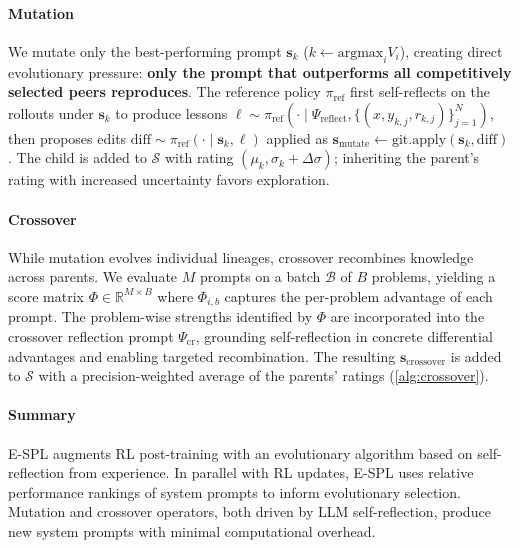 \documentclass{article}
\theoremstyle{plain}
\theoremstyle{definition}
\theoremstyle{remark}
\begin{document}
\vspace{-5pt}
\paragraph{Mutation} We mutate only the best-performing prompt $\mathbf{s}_k$ ($k \leftarrow \mathrm{argmax}_{i} V_{i}$), creating direct evolutionary pressure: \textbf{only the prompt that outperforms all competitively selected peers reproduces}. The reference policy $\pi_{\text{ref}}$ first self-reflects on the rollouts under $\mathbf{s}_k$ to produce lessons $\ell \sim \pi_{\text{ref}}(\cdot \mid \Psi_{\text{reflect}}, \{(x, y_{k,j}, r_{k,j})\}_{j=1}^{N})$, then proposes edits $\mathrm{diff} \sim \pi_{\text{ref}}(\cdot \mid \mathbf{s}_{k}, \ell)$ applied as $\mathbf{s}_{\text{mutate}} \leftarrow \mathrm{git}.\mathrm{apply}(\mathbf{s}_{k}, \mathrm{diff})$. The child is added to $\mathcal{S}$ with rating $(\mu_{k}, \sigma_{k}+\Delta \sigma)$; inheriting the parent's rating with increased uncertainty favors exploration.


\vspace{-5pt}
\paragraph{Crossover} While mutation evolves individual lineages, crossover recombines knowledge across parents. We evaluate $M$ prompts on a batch $\mathcal{B}$ of $B$ problems, yielding a score matrix $\Phi \in \mathbb{R}^{M\times B}$ where $\Phi_{i,b}$ captures the per-problem advantage of each prompt. The problem-wise strengths identified by $\Phi$ are incorporated into the crossover reflection prompt $\Psi_{\mathrm{cr}}$, grounding self-reflection in concrete differential advantages and enabling targeted recombination. The resulting $\mathbf{s}_{\text{crossover}}$ is added to $\mathcal{S}$ with a precision-weighted average of the parents’ ratings (\cref{alg:crossover}).

\vspace{-5pt}
\paragraph{Summary} E-SPL augments RL post-training with an evolutionary algorithm based on self-reflection from experience. In parallel with RL updates, E-SPL uses relative performance rankings of system prompts to inform evolutionary selection. Mutation and crossover operators, both driven by LLM self-reflection, produce new system prompts with minimal computational overhead.
\end{document}
